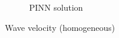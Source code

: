 \begin{frame}
\begin{figure}
\begin{subfigure}[b]{0.45\textwidth}
            \caption{PINN solution}
            \label{fig:10_homogeneous_pinn_swe_velocity}
        \end{subfigure}
        \caption{Wave velocity (homogeneous)}
        \label{fig:11_homogeneous_wave_velocity}
    \end{figure}
\end{frame}